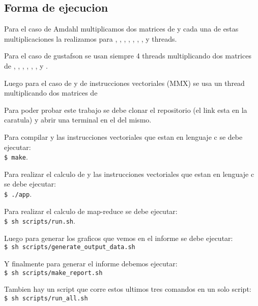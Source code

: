 \subsection{Forma de ejecucion}
    Para el caso de Amdahl multiplicamos dos matrices de  y cada
    una de estas multiplicaciones la realizamos para , ,
    , , , , ,  y 
    threads.

    \hfill \break
    Para el caso de gustafson se usan siempre 4 threads multiplicando dos matrices
    de , , , , ,
    , y .

    \hfill \break
    Luego para el caso de  y de instrucciones vectoriales (MMX)
    se usa un thread multiplicando dos matrices de 

    \hfill \break
    Para poder probar este trabajo se debe clonar el repositorio (el link esta
    en la caratula) y abrir una terminal en el  del mismo.

    \hfill \break
    Para compilar  y las instrucciones vectoriales que estan en
    lenguaje c se debe ejecutar: \\
    \lstinline[columns=fixed]{$ make}.

    \hfill \break
    Para realizar el calculo de   y las instrucciones vectoriales
    que estan en lenguaje c se debe ejecutar: \\
    \lstinline[columns=fixed]{$ ./app}.

    \hfill \break
    Para realizar el calculo de map-reduce se debe ejecutar: \\
    \lstinline[columns=fixed]{$ sh scripts/run.sh}.

    \hfill \break
    Luego para generar los graficos que vemos en el informe se debe
    ejecutar: \\
    \lstinline[columns=fixed]{$ sh scripts/generate_output_data.sh}

    \hfill \break
    Y finalmente para generar el informe debemos ejecutar: \\
    \lstinline[columns=fixed]{$ sh scripts/make_report.sh}

    \hfill \break
    Tambien hay un script que corre estos ultimos tres comandos en un solo script:\\
    \lstinline[columns=fixed]{$ sh scripts/run_all.sh}

